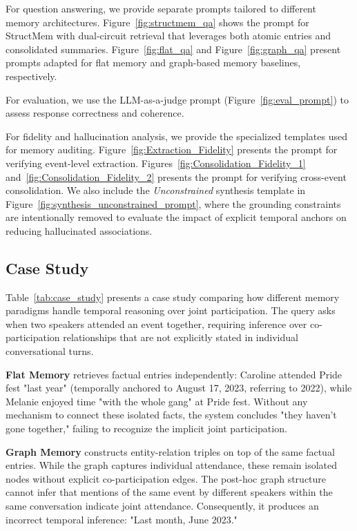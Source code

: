 For question answering, we provide separate prompts tailored to different memory architectures. Figure~\ref{fig:structmem_qa} shows the prompt for StructMem with dual-circuit retrieval that leverages both atomic entries and consolidated summaries. Figure~\ref{fig:flat_qa} and Figure~\ref{fig:graph_qa} present prompts adapted for flat memory and graph-based memory baselines, respectively.

For evaluation, we use the LLM-as-a-judge prompt (Figure~\ref{fig:eval_prompt}) to assess response correctness and coherence. 

For fidelity and hallucination analysis, we provide the specialized templates used for memory auditing. Figure~\ref{fig:Extraction_Fidelity} presents the prompt for verifying event-level extraction. Figures~\ref{fig:Consolidation_Fidelity_1} and~\ref{fig:Consolidation_Fidelity_2} presents the prompt for verifying cross-event consolidation. We also include the \textit{Unconstrained} synthesis template in Figure~\ref{fig:synthesis_unconstrained_prompt}, where the grounding constraints are intentionally removed to evaluate the impact of explicit temporal anchors on reducing hallucinated associations.




\subsection{Case Study}\label{appendix:casestudy}

Table~\ref{tab:case_study} presents a case study comparing how different memory paradigms handle temporal reasoning over joint participation. The query asks when two speakers attended an event together, requiring inference over co-participation relationships that are not explicitly stated in individual conversational turns.

\textbf{Flat Memory} retrieves factual entries independently: Caroline attended Pride fest "last year" (temporally anchored to August 17, 2023, referring to 2022), while Melanie enjoyed time "with the whole gang" at Pride fest. Without any mechanism to connect these isolated facts, the system concludes "they haven't gone together," failing to recognize the implicit joint participation.

\textbf{Graph Memory} constructs entity-relation triples on top of the same factual entries. While the graph captures individual attendance, these remain isolated nodes without explicit co-participation edges. The post-hoc graph structure cannot infer that mentions of the same event by different speakers within the same conversation indicate joint attendance. Consequently, it produces an incorrect temporal inference: "Last month, June 2023."

